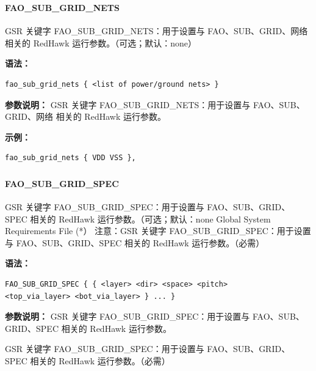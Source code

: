 \subsubsection{}
\paragraph*{FAO_SUB_GRID_NETS}

GSR 关键字 FAO_SUB_GRID_NETS：用于设置与 FAO、SUB、GRID、网络 相关的 RedHawk 运行参数。（可选；默认：none）

\textbf{语法：}
\begin{lstlisting}
fao_sub_grid_nets { <list of power/ground nets> }
\end{lstlisting}

\textbf{参数说明：}
GSR 关键字 FAO\_SUB\_GRID\_NETS：用于设置与 FAO、SUB、GRID、网络 相关的 RedHawk 运行参数。

\textbf{示例：}
\begin{lstlisting}
fao_sub_grid_nets { VDD VSS },
\end{lstlisting}

\subsubsection{}
\paragraph*{FAO_SUB_GRID_SPEC}

GSR 关键字 FAO_SUB_GRID_SPEC：用于设置与 FAO、SUB、GRID、SPEC 相关的 RedHawk 运行参数。（可选；默认：none Global System Requirements File (*） 注意：GSR 关键字 FAO_SUB_GRID_SPEC：用于设置与 FAO、SUB、GRID、SPEC 相关的 RedHawk 运行参数。（必需）

\textbf{语法：}
\begin{lstlisting}
FAO_SUB_GRID_SPEC { { <layer> <dir> <space> <pitch>
<top_via_layer> <bot_via_layer> } ... }
\end{lstlisting}

\textbf{参数说明：}
GSR 关键字 FAO\_SUB\_GRID\_SPEC：用于设置与 FAO、SUB、GRID、SPEC 相关的 RedHawk 运行参数。

\begin{noteBox}
GSR 关键字 FAO\_SUB\_GRID\_SPEC：用于设置与 FAO、SUB、GRID、SPEC 相关的 RedHawk 运行参数。（必需）
\end{noteBox}

\subsubsection{}
